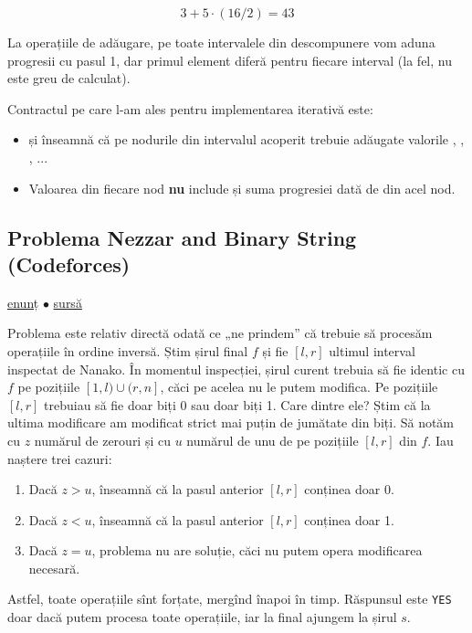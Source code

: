 $$3 + 5 \cdot (16/2) = 43$$

La operațiile de adăugare, pe toate intervalele din descompunere vom aduna progresii cu pasul 1, dar primul element diferă pentru fiecare interval (la fel, nu este greu de calculat).

Contractul pe care l-am ales pentru implementarea iterativă este:

\begin{itemize}
  \item {} și  înseamnă că pe nodurile din intervalul acoperit trebuie adăugate valorile , , , ...
  \item Valoarea  din fiecare nod \textbf{nu} include și suma progresiei dată de  din acel nod.
\end{itemize}

\subsection{Problema Nezzar and Binary String (Codeforces)}

\href{https://codeforces.com/contest/1478/problem/E}{enunț}
$\bullet$
\href{https://codeforces.com/contest/1478/submission/283167039}{sursă}

Problema este relativ directă odată ce „ne prindem” că trebuie să procesăm operațiile în ordine inversă. Știm șirul final $f$ și fie $[l, r]$ ultimul interval inspectat de Nanako. În momentul inspecției, șirul curent trebuia să fie identic cu $f$ pe pozițiile $[1, l) \cup (r,n]$, căci pe acelea nu le putem modifica. Pe pozițiile $[l, r]$ trebuiau să fie doar biți 0 sau doar biți 1. Care dintre ele? Știm că la ultima modificare am modificat strict mai puțin de jumătate din biți. Să notăm cu $z$ numărul de zerouri și cu $u$ numărul de unu de pe pozițiile $[l,r]$ din $f$. Iau naștere trei cazuri:

\begin{enumerate}
  \item Dacă $z > u$, înseamnă că la pasul anterior $[l,r]$ conținea doar 0.
  \item Dacă $z < u$, înseamnă că la pasul anterior $[l,r]$ conținea doar 1.
  \item Dacă $z = u$, problema nu are soluție, căci nu putem opera modificarea necesară.
\end{enumerate}

Astfel, toate operațiile sînt forțate, mergînd înapoi în timp. Răspunsul este \texttt{YES} doar dacă putem procesa toate operațiile, iar la final ajungem la șirul $s$.

